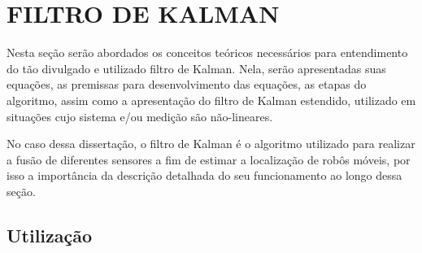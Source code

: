 \documentclass[acronym, symbols, table, deposito]{fei}
\begin{document}
%				
%				
%			
%			
	
	\section{FILTRO DE KALMAN}
		
		Nesta seção serão abordados os conceitos teóricos necessários para entendimento do tão divulgado e utilizado filtro de Kalman. Nela, serão apresentadas suas equações, as premissas para desenvolvimento das equações, as etapas do algoritmo, assim como a apresentação do filtro de Kalman estendido, utilizado em situações cujo sistema e/ou medição são não-lineares. 
		
		No caso dessa dissertação, o filtro de Kalman é o algoritmo utilizado para realizar a fusão de diferentes sensores a fim de estimar a localização de robôs móveis, por isso a importância da descrição detalhada do seu funcionamento ao longo dessa seção.
		
		\subsection{Utilização}
			
\end{document}

